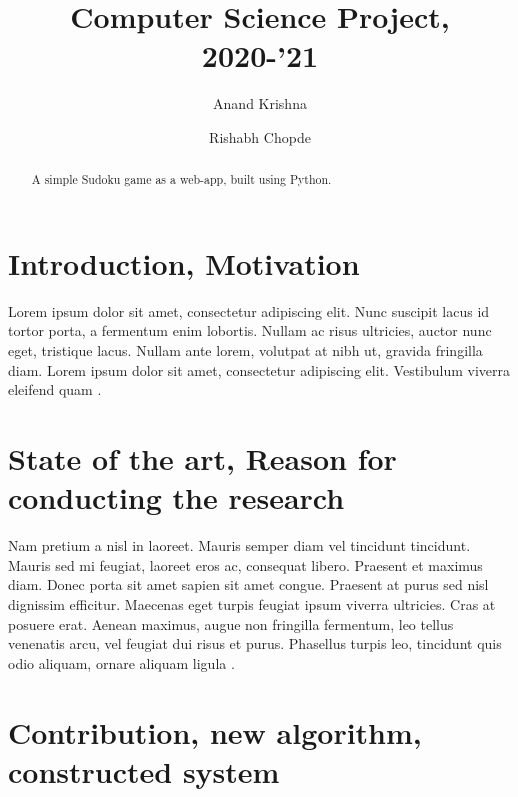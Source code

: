 \documentclass[10pt]{article}
\begin{document}
\begin{opening}

\title{Computer Science Project, 2020-'21}

\author[Institution, address, the first author's e-mail address]{Anand Krishna}

\author[Institution, address, the second author's e-mail address]{Rishabh Chopde}

\begin{abstract}
A simple Sudoku game as a web-app, built using Python. \vspace{1em}

\end{abstract}

\end{opening}

\section{Introduction, Motivation}

Lorem ipsum dolor sit amet, consectetur adipiscing elit. Nunc suscipit lacus id tortor porta, a fermentum enim lobortis. Nullam ac risus ultricies, auctor nunc eget, tristique lacus. Nullam ante lorem, volutpat at nibh ut, gravida fringilla diam. Lorem ipsum dolor sit amet, consectetur adipiscing elit. Vestibulum viverra eleifend quam \cite{RAGNARSSON2011457}.

\section{State of the art, Reason for conducting the research}

Nam pretium a nisl in laoreet. Mauris semper diam vel tincidunt tincidunt. Mauris sed mi feugiat, laoreet eros ac, consequat libero. Praesent et maximus diam. Donec porta sit amet sapien sit amet congue. Praesent at purus sed nisl dignissim efficitur. Maecenas eget turpis feugiat ipsum viverra ultricies. Cras at posuere erat. Aenean maximus, augue non fringilla fermentum, leo tellus venenatis arcu, vel feugiat dui risus et purus. Phasellus turpis leo, tincidunt quis odio aliquam, ornare aliquam ligula \cite{curse}. 

\section{Contribution, new algorithm, constructed system}
\end{document}
